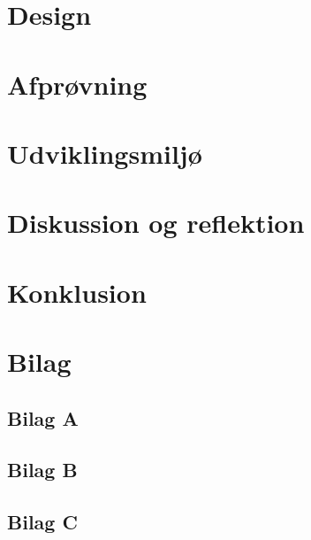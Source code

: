 \documentclass[12pt]{article}
\begin{document}
\section{Design}
\label{sec:design}

\section{Afprøvning}
\label{sec:afproevning}

\section{Udviklingsmiljø}
\label{sec:udvikling}

\section{Diskussion og reflektion}
\label{sec:diskussion}

\section{Konklusion}
\label{sec:konklusion}

\section{Bilag}
\label{sec:bilag}

\subsection{Bilag A}
\label{sec:bilagA}

\subsection{Bilag B}
\label{sec:bilagB}

\subsection{Bilag C}
\label{sec:bilagC}
\end{document}
